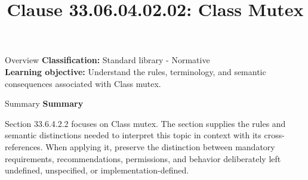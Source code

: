 \documentclass[10pt,letterpaper]{article}
\title{Clause 33.06.04.02.02: Class Mutex}
\author{}
\date{}
\begin{document}
\maketitle
\begin{CornellOverviewBox}{Overview}
\textbf{Classification:} Standard library - Normative\\[2pt]
\textbf{Learning objective:} Understand the rules, terminology, and semantic consequences associated with Class mutex.
\end{CornellOverviewBox}\begin{CornellSummaryBox}{Summary}
{\sffamily\bfseries\color{Accent} Summary}\par\vspace{3pt}Section 33.6.4.2.2 focuses on Class mutex. The section supplies the rules and semantic distinctions needed to interpret this topic in context with its cross-references. When applying it, preserve the distinction between mandatory requirements, recommendations, permissions, and behavior deliberately left undefined, unspecified, or implementation-defined.
\end{CornellSummaryBox}
\end{document}
